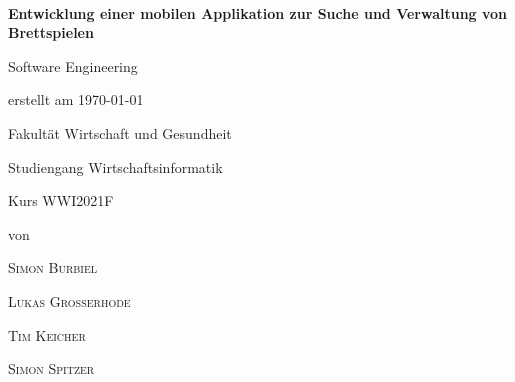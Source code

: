 \newcommand{\typMeinerArbeit}{Software Engineering} 

\newcommand{\themaMeinerArbeit}{Entwicklung einer mobilen Applikation zur Suche und Verwaltung von Brettspielen}

\newcommand{\meinNameSB}{Simon Burbiel}
\newcommand{\meinNameLG}{Lukas Großerhode}
\newcommand{\meinNameSS}{Simon Spitzer}
\newcommand{\meinNameTK}{Tim Keicher}

\thispagestyle{empty}

\begin{spacing}{1}
\begin{center}	
~\vspace{0mm}

{\sffamily
\LARGE  
\textbf{Entwicklung einer mobilen Applikation zur Suche und Verwaltung von Brettspielen}

}


\vspace{15mm}

{\Large \typMeinerArbeit}

\vspace{1cm}

erstellt am \today 

\vspace{15mm}

Fakultät Wirtschaft und Gesundheit
\medskip

Studiengang Wirtschaftsinformatik
\medskip

Kurs WWI2021F 

\vspace{10mm}

von

\vspace{10mm}

{\large\textsc{\meinNameSB}}
\medskip

{\large\textsc{\meinNameLG}}
\medskip

{\large\textsc{\meinNameTK}}
\medskip

{\large\textsc{\meinNameSS}}
\medskip

\vspace{10mm}
\end{center}

\vfill




\vspace{1cm}
\end{spacing}

